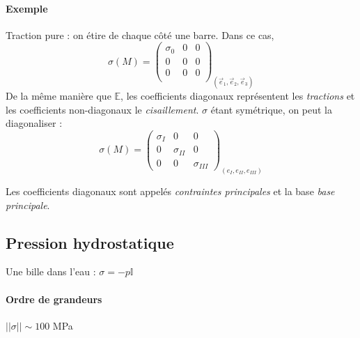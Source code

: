 \documentclass{article}
\begin{document}
\paragraph{Exemple} Traction pure : on étire de chaque côté une barre. Dans ce cas,
\[\sigma(M) = \begin{pmatrix}
\sigma_0 & 0 & 0\\
0 & 0 & 0\\
0 & 0 & 0\\
\end{pmatrix}_{(\vec{e}_1, \vec{e}_2, \vec{e}_3)}\]
\bigskip
De la même manière que $\mathbb{E}$, les coefficients diagonaux représentent les \emph{tractions} et les coefficients non-diagonaux le \emph{cisaillement}.
$\sigma$ étant symétrique, on peut la diagonaliser :
\[\sigma(M) = \begin{pmatrix}
\sigma_I & 0 & 0\\
0 & \sigma_{II} & 0\\
0 & 0 & \sigma_{III}
\end{pmatrix}_{(e_I, e_{II}, e_{III})}
\]

Les coefficients diagonaux sont appelés \emph{contraintes principales} et la base \emph{base principale}.


\subsection{Pression hydrostatique}
Une bille dans l'eau : $\sigma = -p \mathbb{I}$


\paragraph{Ordre de grandeurs} $|| \sigma || \sim 100$ MPa
\end{document}
